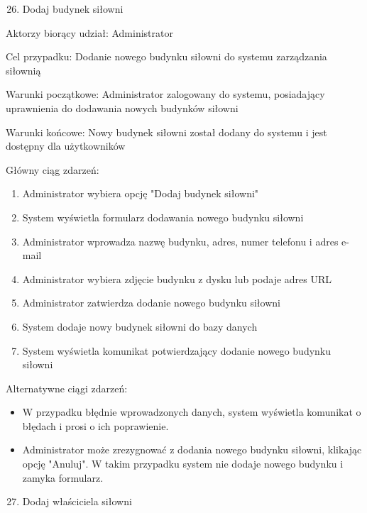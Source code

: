 \documentclass[
]{article}
\providecommand{\tightlist}{%
  \setlength{\itemsep}{0pt}\setlength{\parskip}{0pt}}
\begin{document}
{}

{}

\begin{enumerate}
\setcounter{enumi}{25}
\tightlist
\item
  {Dodaj budynek siłowni}
\end{enumerate}

{Aktorzy biorący udział: Administrator}

{Cel przypadku: Dodanie nowego budynku siłowni do systemu zarządzania
siłownią}

{Warunki początkowe: Administrator zalogowany do systemu, posiadający
uprawnienia do dodawania nowych budynków siłowni}

{Warunki końcowe: Nowy budynek siłowni został dodany do systemu i jest
dostępny dla użytkowników}

{Główny ciąg zdarzeń:}

\begin{enumerate}
\tightlist
\item
  {Administrator wybiera opcję "Dodaj budynek siłowni"}
\item
  {System wyświetla formularz dodawania nowego budynku siłowni}
\item
  {Administrator wprowadza nazwę budynku, adres, numer telefonu i adres
  e-mail}
\item
  {Administrator wybiera zdjęcie budynku z dysku lub podaje adres URL}
\item
  {Administrator zatwierdza dodanie nowego budynku siłowni}
\item
  {System dodaje nowy budynek siłowni do bazy danych}
\item
  {System wyświetla komunikat potwierdzający dodanie nowego budynku
  siłowni}
\end{enumerate}

{Alternatywne ciągi zdarzeń:}

\begin{itemize}
\tightlist
\item
  {W przypadku błędnie wprowadzonych danych, system wyświetla komunikat
  o błędach i prosi o ich poprawienie.}
\item
  {Administrator może zrezygnować z dodania nowego budynku siłowni,
  klikając opcję "Anuluj". W takim przypadku system nie dodaje nowego
  budynku i zamyka formularz.}
\end{itemize}

{}

{}

\begin{enumerate}
\setcounter{enumi}{26}
\tightlist
\item
  {Dodaj właściciela siłowni}
\end{enumerate}
\end{document}

